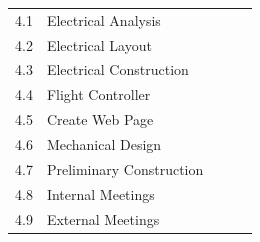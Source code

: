 \begin{center}
\begin{tabular}{cllll}
4.1     & Electrical Analysis &  &  \\\rowcolor{gainsboro}
4.2     & Electrical Layout &  & \\
4.3     & Electrical Construction & & \\ \rowcolor{gainsboro}
4.4     & Flight Controller & & \\
4.5     & Create Web Page & &  
\\\rowcolor{gainsboro}
4.6     & Mechanical Design & & \\
4.7     & Preliminary Construction & & 
\\\rowcolor{gainsboro}
4.8       & Internal Meetings      &    & \\
4.9       & External Meetings      &    & 
\end{tabular}                                                                   
\end{center}
\newpage

